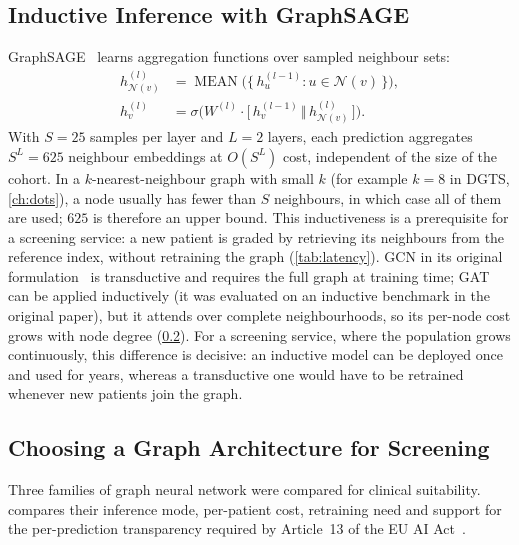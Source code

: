 \subsection{Inductive Inference with GraphSAGE}
\label{sec:sage}

GraphSAGE~\cite{hamilton2017graphsage} learns aggregation functions over sampled
neighbour sets:
\begin{align}
h^{(l)}_{\mathcal{N}(v)} &= \operatorname{MEAN}\bigl(\{\,h^{(l-1)}_u : u\in\mathcal{N}(v)\,\}\bigr),
\label{eq:sage-agg}\\
h^{(l)}_v &= \sigma\bigl(W^{(l)}\cdot\bigl[\,h^{(l-1)}_v \,\Vert\, h^{(l)}_{\mathcal{N}(v)}\,\bigr]\bigr).
\label{eq:sage-upd}
\end{align}
With $S=25$ samples per layer and $L=2$ layers, each prediction aggregates $S^L=625$
neighbour embeddings at $O(S^L)$ cost, independent of the size of the cohort. In a
$k$-nearest-neighbour graph with small $k$ (for example $k=8$ in DGTS, \cref{ch:dots}), a
node usually has fewer than $S$ neighbours, in which case all of them are used; $625$ is
therefore an upper bound. This inductiveness is a prerequisite for a screening service: a
new patient is graded by retrieving its neighbours from the reference index, without
retraining the graph (\cref{tab:latency}). GCN
in its original formulation~\cite{kipf2017gcn} is transductive and requires the full
graph at training time; GAT~\cite{velickovic2018gat} can be applied inductively (it was
evaluated on an inductive benchmark in the original paper), but it attends over complete
neighbourhoods, so its per-node cost grows with node degree (\cref{sec:gnnvariants}). For a screening service, where the population grows continuously, this difference is decisive: an inductive model can be deployed once and used for years, whereas a transductive one would have to be retrained whenever new patients join the graph.

\subsection{Choosing a Graph Architecture for Screening}
\label{sec:gnnvariants}

Three families of graph neural network were compared for clinical suitability.
 compares their inference mode, per-patient cost, retraining need and
support for the per-prediction transparency required by Article~13 of the EU AI
Act~\cite{euaiact2024}.

